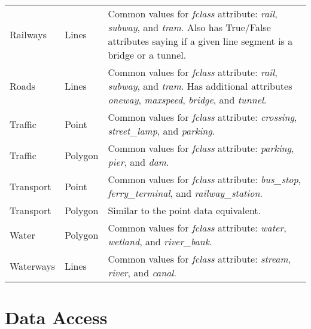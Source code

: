\begin{longtable}{p{3cm}p{2.3cm}p{8cm}}
    Railways           & Lines              & Common values for \emph{fclass} attribute: \emph{rail}, \emph{subway}, and \emph{tram}. Also has True/False attributes saying if a given line segment is a bridge or a tunnel.      \\
    Roads              & Lines              & Common values for \emph{fclass} attribute: \emph{rail}, \emph{subway}, and \emph{tram}. Has additional attributes \emph{oneway}, \emph{maxspeed}, \emph{bridge}, and \emph{tunnel}. \\
    Traffic            & Point              & Common values for \emph{fclass} attribute: \emph{crossing}, \emph{street\_lamp}, and \emph{parking}.                                                                                \\
    Traffic            & Polygon            & Common values for \emph{fclass} attribute: \emph{parking}, \emph{pier}, and \emph{dam}.                                                                                             \\
    Transport          & Point              & Common values for \emph{fclass} attribute: \emph{bus\_stop}, \emph{ferry\_terminal}, and \emph{railway\_station}.                                                                   \\
    Transport          & Polygon            & Similar to the point data equivalent.                                                                                                                                               \\
    Water              & Polygon            & Common values for \emph{fclass} attribute: \emph{water}, \emph{wetland}, and \emph{river\_bank}.                                                                                    \\
    Waterways          & Lines              & Common values for \emph{fclass} attribute: \emph{stream}, \emph{river}, and \emph{canal}.                                                                                           \\
\end{longtable}

\section{Data Access}
\label{sec:data-access}

